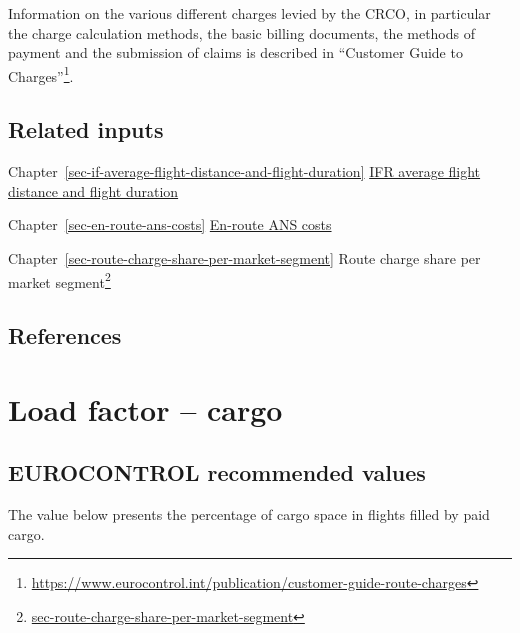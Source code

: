 \documentclass[
  11pt,
  a4paper,
]{book}
\DeclareRobustCommand{\href}[2]{#2\footnote{\url{#1}}}
\begin{document}
Information on the various different charges levied by the CRCO, in
particular the charge calculation methods, the basic billing documents,
the methods of payment and the submission of claims is described in
\href{https://www.eurocontrol.int/publication/customer-guide-route-charges}{``Customer
Guide to Charges''}.

\hypertarget{related-inputs-16}{%
\section{Related inputs}\label{related-inputs-16}}

Chapter~\ref{sec-if-average-flight-distance-and-flight-duration}
\protect\hyperlink{sec-if-average-flight-distance-and-flight-duration}{IFR
average flight distance and flight duration}

Chapter~\ref{sec-en-route-ans-costs}
\protect\hyperlink{sec-en-route-ans-costs}{En-route ANS costs}

Chapter~\ref{sec-route-charge-share-per-market-segment}
\href{sec-route-charge-share-per-market-segment}{Route charge share per
market segment}

\hypertarget{references-20}{%
\section{References}\label{references-20}}

\hypertarget{sec-load-factor-cargo}{%
\chapter{Load factor -- cargo}\label{sec-load-factor-cargo}}

\hypertarget{eurocontrol-recommended-values-19}{%
\section{EUROCONTROL recommended
values}\label{eurocontrol-recommended-values-19}}

The value below presents the percentage of cargo space in flights filled
by paid cargo.
\end{document}
